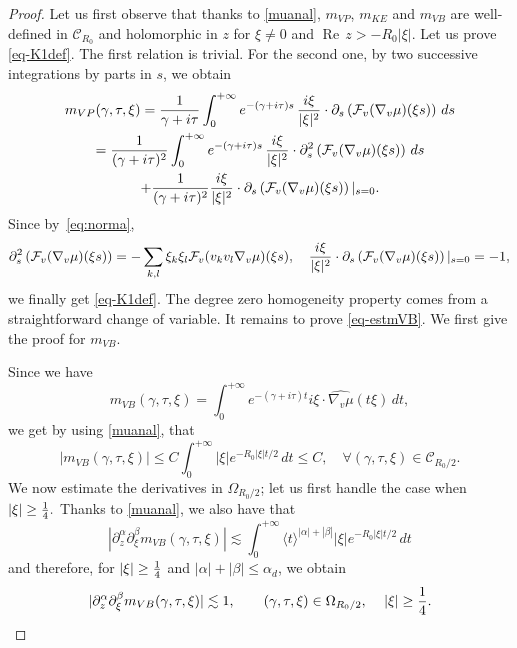 \documentclass[11pt]{amsart}
\newcommand{\pa}{\partial}
\numberwithin{equation}{section}
\newcommand{\na}{\nabla}
\begin{document}
\begin{proof} 
Let us first observe that thanks to \eqref{muanal}, $m_{VP}$, $m_{KE}$ and $m_{VB}$ are well-defined
 in $\mathcal{C}_{R_{0}}$ and holomorphic in $z$ for $\xi\neq 0$ and $\operatorname{Re}\, z > - R_{0} | \xi|$.
 Let us prove  \eqref{eq-K1def}. The first relation is trivial. For the second one, 
by two successive integrations by parts in $s$, we obtain
\begin{multline*}
m_{VP}(\gamma, \tau, \xi)  = \frac{1}{\gamma +i \tau}  \int_{0}^{+ \infty} e^{-(\gamma + i \tau)s}\, {i \xi \over  |\xi|^2}\cdot  \pa_s \left(\mathcal{F}_v( \na_v \mu)(\xi s)\right) \, d s  %
\\ =   \frac{1}{(\gamma +i \tau)^2}  \int_{0}^{+ \infty} e^{-(\gamma + i \tau)s}\, {i \xi \over  |\xi|^2}\cdot  \pa^2_{s} \left(\mathcal{F}_v( \na_v \mu)(\xi s)\right) \, d s  \\
  + \frac{1}{(\gamma +i \tau)^2}  {i \xi \over  |\xi|^2} \cdot \pa_s \left(\mathcal{F}_v( \na_v \mu)(\xi s)\right)|_{s=0}.
\end{multline*}
Since by~\eqref{eq:norma}, 
$$
 \pa^2_{s} \left(\mathcal{F}_v( \na_v \mu)(\xi s)\right) = -  \sum_{k,l} \xi_k \xi_l \mathcal{F}_v( v_k v_l \na_v \mu)(\xi s) , \quad
 {i \xi \over  |\xi|^2} \cdot  \pa_s \left(\mathcal{F}_v( \na_v \mu)(\xi s)\right)|_{s=0} = -1,
$$
we finally get   \eqref{eq-K1def}. The degree zero homogeneity property comes from a  straightforward change of variable.
It  remains to prove \eqref{eq-estmVB}. We first give the proof  for $m_{VB}$.

 Since  we have 
  $$  m_{VB}(\gamma, \tau, \xi)=  \int_{0}^{+\infty} e^{- (\gamma+ i \tau )t}   i  \xi \cdot \widehat{\nabla_{v} \mu}
  (t \xi) \, dt, $$
   we get by using  \eqref{muanal}, that 
         $$  |m_{VB}(\gamma, \tau, \xi)| \leq C \int_{0}^{+ \infty} | \xi | e^{-  R_{0}  | \xi|  t/2 } \, dt \leq C, 
          \quad \forall (\gamma, \tau, \xi) \in \mathcal{C}_{R_{0}/2} .$$
  We now estimate the derivatives in $ \Omega_{R_{0}/2}$;  let us first handle the case when $|\xi| \geq {1 \over 4}.$ 
Thanks to \eqref{muanal},  we also  have that 
   $$ | \partial_{z}^\alpha \partial_{\xi}^\beta m_{VB}(\gamma, \tau, \xi) | \lesssim 
     \int_{0}^{+ \infty}    \langle t \rangle^{|\alpha| + | \beta|}  | \xi | e^{-  R_{0}  | \xi|  t/2 } \, dt $$
     and therefore, for $|\xi| \geq {1\over 4}$ and $| \alpha| + |\beta | \leq \alpha_d$, we obtain
     \begin{equation}\label{bd-X1}   | \partial_{z}^\alpha \partial_{\xi}^\beta m_{VB}(\gamma, \tau, \xi) | \lesssim  1, \qquad  (\gamma, \tau, \xi) \in \Omega_{R_{0}/2}, \, 
\quad      | \xi | \geq { 1 \over 4}.\end{equation}


\end{proof}
\end{document}
